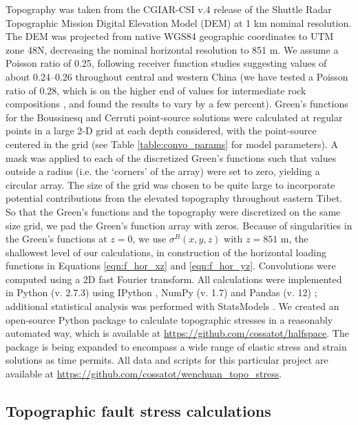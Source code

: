 \documentclass[draft,jgrga]{AGUTeX}
\begin{document}
\begin{article}
Topography was taken from the CGIAR-CSI v.4 release
\citep{jarvis2008srtm} of the Shuttle Radar Topographic Mission
\citep{farr2007srtm} Digital Elevation Model (DEM) at 1 km nominal
resolution. The DEM was projected from native WGS84 geographic
coordinates to UTM zone 48N, decreasing the nominal horizontal
resolution to 851 m. We assume a Poisson ratio of 0.25, following
receiver function studies suggesting values of about 0.24--0.26 throughout
central and western China \citep{chen2010receiverfn} (we have tested a Poisson
ratio of 0.28, which is on the higher end of values for intermediate rock
compositions \citep{zandtammon1995}, and found the results to vary by a few
percent). Green's
functions for the Boussinesq and Cerruti point-source solutions were
calculated at regular points in a large 2-D grid at each depth
considered, with the point-source centered in the grid (see Table
\ref{table:convo_params} for model parameters). A mask was applied to
each of the discretized Green's functions such that values outside a 
radius (i.e. the `corners' of the array) were set to zero, yielding a
circular array. The size of the
grid was chosen to be quite large to incorporate potential contributions
from the elevated topography throughout eastern Tibet. So that the
Green's functions and the topography were discretized on the same size
grid, we pad the Green's function array with zeros. Because of
singularities in the Green's functions at $z=0$, we use
$\sigma^B(x,y,z)$ with $z=851$ m, the shallowest level of our
calculations, in construction of the horizontal loading functions in
Equations \ref{eqn:f_hor_xz} and \ref{eqn:f_hor_yz}. Convolutions were
computed using a 2D fast Fourier transform. All calculations were
implemented in Python (v. 2.7.3) using IPython \citep{perez2007ipython},
NumPy (v. 1.7) \citep{oliphant2007numpy} and Pandas (v. 12)
\citep{mckinney2010}; additional statistical analysis was performed with
StatsModels \citep{seabold2010}. We created an open-source Python package
to calculate topographic stresses in a reasonably automated way, which
is available at \url{https://github.com/cossatot/halfspace}. The package
is being expanded to encompass a wide range of elastic stress and strain
solutions as time permits. All data and scripts for this particular
project are available at
\url{https://github.com/cossatot/wenchuan\_topo\_stress}.

\subsection{Topographic fault stress
calculations}\label{topographic-fault-stress-calculations}


\end{article}
\end{document}
